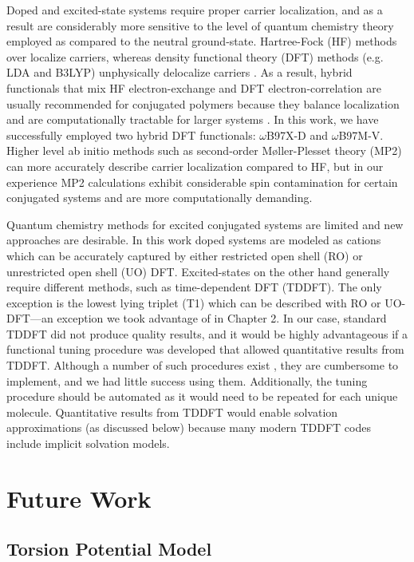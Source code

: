 Doped and excited-state systems require proper carrier localization, and as a result are considerably more sensitive to the level of quantum chemistry theory employed as compared to the neutral ground-state. Hartree-Fock (HF) methods over localize carriers, whereas density functional theory (DFT) methods (e.g. LDA and B3LYP) unphysically delocalize carriers \cite{Vlcek2016}. As a result, hybrid functionals that mix HF electron-exchange and DFT electron-correlation are usually recommended for conjugated polymers because they balance localization and are computationally tractable for larger systems \cite{Salzner2011, Salzner2014}. In this work, we have successfully employed two hybrid DFT functionals: $\omega$B97X-D and $\omega$B97M-V. Higher level ab initio methods such as second-order M\o ller-Plesset theory (MP2) can more accurately describe carrier localization compared to HF, but in our experience MP2 calculations exhibit considerable spin contamination for certain conjugated systems and are more computationally demanding.

Quantum chemistry methods for excited conjugated systems are limited and new approaches are desirable. In this work doped systems are modeled as cations which can be accurately captured by either restricted open shell (RO) or unrestricted open shell (UO) DFT. Excited-states on the other hand generally require different methods, such as time-dependent DFT (TDDFT). The only exception is the lowest lying triplet (T1) which can be described with RO or UO-DFT---an exception we took advantage of in Chapter 2. In our case, standard TDDFT did not produce quality results, and it would be highly advantageous if a functional tuning procedure was developed that allowed quantitative results from TDDFT. Although a number of such procedures exist \cite{Korzdorfer2014, Lin2019}, they are cumbersome to implement, and we had little success using them. Additionally, the tuning procedure should be automated as it would need to be repeated for each unique molecule. Quantitative results from TDDFT would enable solvation approximations (as discussed below) because many modern TDDFT codes include implicit solvation models.

\section{Future Work}

\subsection{Torsion Potential Model}

